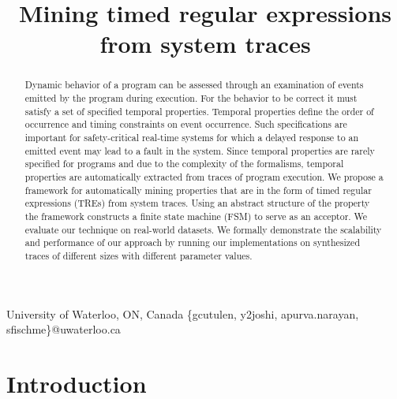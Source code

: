 \documentclass[]{sigplanconf}
\begin{document}
\title{Mining timed regular expressions from system traces}

		   {University of Waterloo, ON, Canada}
		   {\{gcutulen, y2joshi, apurva.narayan, sfischme\}@uwaterloo.ca}

\maketitle

\begin{abstract}

Dynamic behavior of a program can be assessed through an examination of events emitted by the program during execution. For the behavior to be correct it must satisfy a set of specified temporal properties. Temporal properties define the order of occurrence and timing constraints on event occurrence. Such specifications are important for safety-critical real-time systems for which a delayed response to an emitted event may lead to a fault in the system. Since temporal properties are rarely specified for programs and due to the complexity of the formalisms, temporal properties are automatically extracted from traces of program execution. We propose a framework for automatically mining properties that are in the form of timed regular expressions (TREs) from system traces. Using an abstract structure of the property the framework constructs a finite state machine (FSM) to serve as an acceptor. We evaluate our technique on real-world datasets. We formally demonstrate the scalability and performance of our approach by running our implementations on synthesized traces of different sizes with different parameter values.

\end{abstract}

\section{Introduction}
\end{document}
